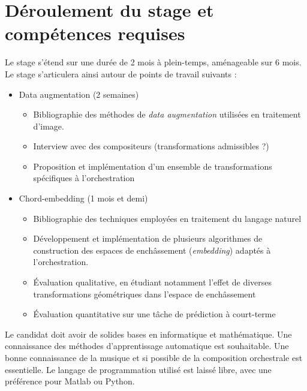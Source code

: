 \documentclass[a4paper, 10pt]{article} %
\begin{document}
\section*{Déroulement du stage et compétences requises}
Le stage s'étend sur une durée de 2 mois à plein-temps, aménageable sur 6 mois.
Le stage s'articulera ainsi autour de points de travail suivants :
\begin{itemize}
\item Data augmentation (2 semaines)
\begin{itemize}
\item Bibliographie des méthodes de \textit{data augmentation} utilisées en traitement d'image.
\item Interview avec des compositeurs (transformations admissibles ?)
\item Proposition et implémentation d'un ensemble de transformations spécifiques à l'orchestration
\end{itemize}
\item Chord-embedding (1 mois et demi)
\begin{itemize}
\item Bibliographie des techniques employées en traitement du langage naturel \cite{mikolov2013distributed, DBLP:journals/corr/KirosZSZTUF15}
\item Développement et implémentation de plusieurs algorithmes de construction des espaces de enchâssement (\textit{embedding}) adaptés à l'orchestration.
\item Évaluation qualitative, en étudiant notamment l'effet de diverses transformations géométriques dans l'espace de enchâssement
\item Évaluation quantitative sur une tâche de prédiction à court-terme
\end{itemize}
\end{itemize}

Le candidat doit avoir de solides bases en informatique et mathématique. Une connaissance des méthodes d'apprentissage automatique est souhaitable.
Une bonne connaissance de la musique et si possible de la composition orchestrale est essentielle. Le langage de programmation utilisé est laissé libre, avec une préférence pour Matlab ou Python.






\end{document}
